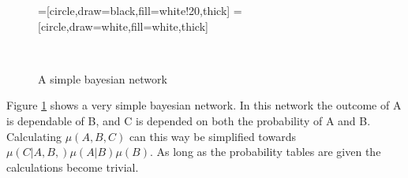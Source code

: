 \documentclass[12pt]{article} %
\begin{document}
\begin{figure}[h]
    \begin{center}
        =[circle,draw=black,fill=white!20,thick]
        =[circle,draw=white,fill=white,thick]
        \caption{ A simple bayesian network}
        \label{ref:simple}\
    \end{center}
\end{figure}



Figure \ref{ref:simple} shows a very simple bayesian network. In this network
the outcome of A is dependable of B, and C is depended on both the probability
of A and B. Calculating
$\mu(A, B, C)$ can this way be simplified towards $\mu(C|A,B,)\mu(A|B)\mu(B)$.
As long as the probability tables are given the calculations become trivial.
\end{document}
